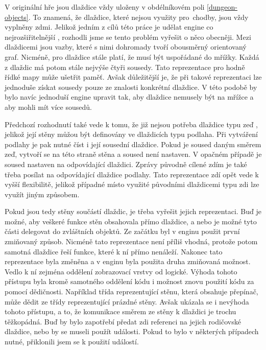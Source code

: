 V originální hře jsou dlaždice vždy uloženy v obdélníkovém poli \vref{dungeon-objects}. To znamená, že dlaždice, které nejsou využity pro~chodby,
jsou vždy vyplněny zdmi. Jelikož jedním z cílů této práce je udělat engine co nejrozšiřitelnější , rozhodli jsme se tento problém vyřešit
o něco obecněji. Mezi dlaždicemi jsou vazby, které s nimi dohromady tvoří obousměrný orientovaný graf. Nicméně, pro dlaždice stále platí, že musí být
uspořádané do mřížky. Každá z dlaždic má potom stále nejvýše čtyři sousedy. Tato reprezentace pro hodně řídké mapy může ušetřit paměť.
Avšak důležitější je, že při takové reprezentaci lze jednoduše získat sousedy pouze ze znalosti konkrétní dlaždice. V této 
podobě by bylo navíc jednoduší engine upravit tak, aby dlaždice nemusely být na mřížce a aby mohli mít více sousedů.

Předchozí rozhodnutí také vede k tomu, že již nejsou potřeba dlaždice typu zeď , jelikož její stěny můžou být definovány ve 
dlaždicích typu podlaha. Při vytváření podlahy je pak nutné číst i její sousední dlaždice. Pokud je soused daným směrem zeď, 
vytvoří se na této straně stěna a soused není nastaven. V opačném případě je soused nastaven na odpovídající dlaždici.
Zprávy původně cílené zdím je také třeba posílat na odpovídající dlaždice podlahy. Tato reprezentace zdí opět vede k
vyšší flexibilitě, jelikož případné místo využité původními dlaždicemi typu zdi lze využít jiným způsobem.


Pokud jsou tedy stěny součástí dlaždic, je třeba vyřešit jejich reprezentaci. Buď je možné, aby veškeré funkce stěn obsahovala přímo
dlaždice, a nebo je možné tyto části delegovat do zvláštních objektů. Ze začátku byl v enginu použit první zmiňovaný způsob. Nicméně 
tato reprezentace není příliš vhodná, protože potom samotná dlaždice řeší funkce, které k ní přímo nenáleží.
Nakonec tato reprezentace byla změněna a v enginu byla použita druha zmiňovaná možnost. Vedlo k ní zejména oddělení zobrazovací vrstvy 
od logické. Výhoda tohoto přístupu byla kromě samotného oddělení kódu i možnost znovu použití kódu za pomocí dědičnosti. 
Například třída reprezentující stěnu, která obsahuje přepínač, může dědit ze třídy reprezentující prázdné stěny. 
Avšak ukázala se i nevýhoda tohoto přístupu, a to, že komunikace směrem ze stěny k dlaždici je trochu těžkopádná.
Buď by bylo zapotřebí předat zdi referenci na jejich rodičovské dlaždice, nebo by se museli
použít události. Pokud to bylo v některých případech nutné, přiklonili jsem se k použití událostí.

